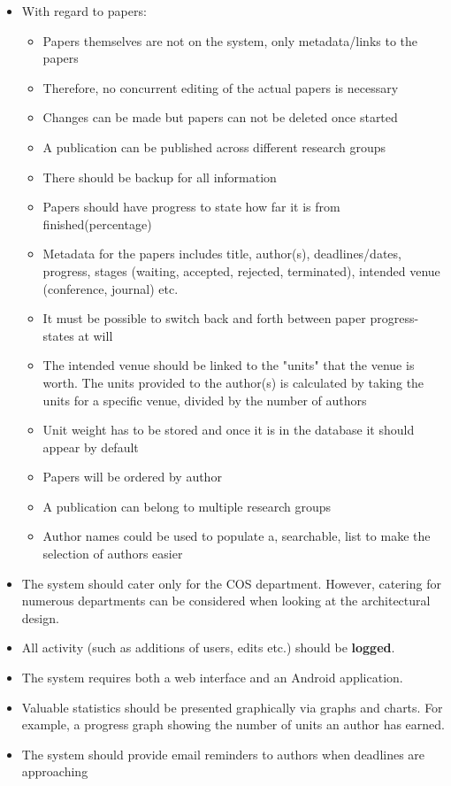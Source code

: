 \documentclass[a4paper,12pt]{article}
\begin{document}
\begin{itemize}
\item With regard to papers:
\begin{itemize}
\item Papers themselves are not on the system, only metadata/links to the papers
\item Therefore, no concurrent editing of the actual papers is necessary
\item Changes can be made but papers can not be deleted once started
\item A publication can be published across different research groups
\item There should be backup for all information 
\item Papers should have progress to state how far it is from finished(percentage)
\item Metadata for the papers includes title, author(s), deadlines/dates, progress, stages (waiting, accepted, rejected, terminated), intended venue (conference, journal) etc.
\item It must be possible to switch back and forth between paper progress-states at will
\item The intended venue should be linked to the "units" that the venue is worth. The units provided to the author(s) is calculated by taking the units for a specific venue, divided by the number of authors
\item Unit weight has to be stored and once it is in the database it should appear by default
\item Papers will be ordered by author
\item A publication can belong to multiple research groups
\item Author names could be used to populate a, searchable, list to make the selection of authors easier
\end{itemize}

\item The system should cater only for the COS department. However, catering for numerous departments can be considered when looking at the architectural design.

\item All activity (such as additions of users, edits etc.) should be \textbf{logged}.

\item The system requires both a web interface and an Android application.

\item Valuable statistics should be presented graphically via graphs and charts. For example, a progress graph showing the number of units an author has earned.

\item The system should provide email reminders to authors when deadlines are approaching

\end{itemize}
\end{document}
